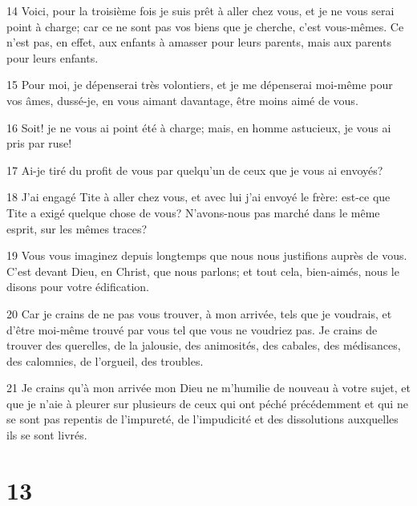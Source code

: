 \par 14 Voici, pour la troisième fois je suis prêt à aller chez vous, et je ne vous serai point à charge; car ce ne sont pas vos biens que je cherche, c'est vous-mêmes. Ce n'est pas, en effet, aux enfants à amasser pour leurs parents, mais aux parents pour leurs enfants.
\par 15 Pour moi, je dépenserai très volontiers, et je me dépenserai moi-même pour vos âmes, dussé-je, en vous aimant davantage, être moins aimé de vous.
\par 16 Soit! je ne vous ai point été à charge; mais, en homme astucieux, je vous ai pris par ruse!
\par 17 Ai-je tiré du profit de vous par quelqu'un de ceux que je vous ai envoyés?
\par 18 J'ai engagé Tite à aller chez vous, et avec lui j'ai envoyé le frère: est-ce que Tite a exigé quelque chose de vous? N'avons-nous pas marché dans le même esprit, sur les mêmes traces?
\par 19 Vous vous imaginez depuis longtemps que nous nous justifions auprès de vous. C'est devant Dieu, en Christ, que nous parlons; et tout cela, bien-aimés, nous le disons pour votre édification.
\par 20 Car je crains de ne pas vous trouver, à mon arrivée, tels que je voudrais, et d'être moi-même trouvé par vous tel que vous ne voudriez pas. Je crains de trouver des querelles, de la jalousie, des animosités, des cabales, des médisances, des calomnies, de l'orgueil, des troubles.
\par 21 Je crains qu'à mon arrivée mon Dieu ne m'humilie de nouveau à votre sujet, et que je n'aie à pleurer sur plusieurs de ceux qui ont péché précédemment et qui ne se sont pas repentis de l'impureté, de l'impudicité et des dissolutions auxquelles ils se sont livrés.

\chapter{13}

